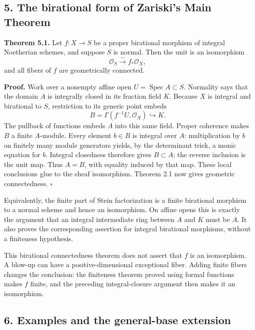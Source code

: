 \documentclass[11pt]{article}
\begin{document}
\subsection{5. The birational form of Zariski's Main
Theorem}\label{the-birational-form-of-zariskis-main-theorem}

\textbf{Theorem 5.1.} Let \(f:X\to S\) be a proper birational morphism
of integral Noetherian schemes, and suppose \(S\) is normal. Then the
unit is an isomorphism \[
\mathcal O_S\xrightarrow{\sim}f_*\mathcal O_X,
\] and all fibers of \(f\) are geometrically connected.

\textbf{Proof.} Work over a nonempty affine open
\(U=\operatorname{Spec}A\subset S\). Normality says that the domain
\(A\) is integrally closed in its fraction field \(K\). Because \(X\) is
integral and birational to \(S\), restriction to its generic point
embeds \[
B=\Gamma(f^{-1}U,\mathcal O_X)\hookrightarrow K.
\] The pullback of functions embeds \(A\) into this same field. Proper
coherence makes \(B\) a finite \(A\)-module. Every element \(b\in B\) is
integral over \(A\): multiplication by \(b\) on finitely many module
generators yields, by the determinant trick, a monic equation for \(b\).
Integral closedness therefore gives \(B\subset A\); the reverse
inclusion is the unit map. Thus \(A=B\), with equality induced by that
map. These local conclusions glue to the sheaf isomorphism. Theorem 2.1
now gives geometric connectedness. \(\square\)

Equivalently, the finite part of Stein factorization is a finite
birational morphism to a normal scheme and hence an isomorphism. On
affine opens this is exactly the argument that an integral intermediate
ring between \(A\) and \(K\) must be \(A\). It also proves the
corresponding assertion for integral birational morphisms, without a
finiteness hypothesis.

This birational connectedness theorem does not assert that \(f\) is an
isomorphism. A blow-up can have a positive-dimensional exceptional
fiber. Adding finite fibers changes the conclusion: the finiteness
theorem proved using formal functions makes \(f\) finite, and the
preceding integral-closure argument then makes it an isomorphism.

\subsection{6. Examples and the general-base
extension}\label{examples-and-the-general-base-extension}
\end{document}
